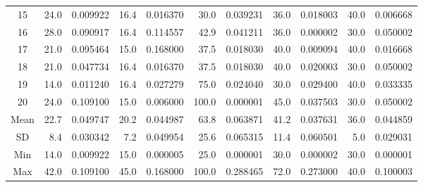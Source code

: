 \documentclass[12pt]{article}
\begin{document}
\begin{table}[h]
\begin{minipage}{\textwidth}
\begin{tabular}{crcrcrcccrc}
15	&	24.0	&	0.009922	&	16.4	&	0.016370	&	30.0	&	0.039231	&	36.0	&	0.018003	&	40.0	&	0.006668	\\
16	&	28.0	&	0.090917	&	16.4	&	0.114557	&	42.9	&	0.041211	&	36.0	&	0.000002	&	30.0	&	0.050002	\\
17	&	21.0	&	0.095464	&	15.0	&	0.168000	&	37.5	&	0.018030	&	40.0	&	0.009094	&	40.0	&	0.016668	\\
18	&	21.0	&	0.047734	&	16.4	&	0.016370	&	37.5	&	0.018030	&	40.0	&	0.020003	&	30.0	&	0.050002	\\
19	&	14.0	&	0.011240	&	16.4	&	0.027279	&	75.0	&	0.024040	&	30.0	&	0.029400	&	40.0	&	0.033335	\\
20	&	24.0	&	0.109100	&	15.0	&	0.006000	&	100.0	&	0.000001	&	45.0	&	0.037503	&	30.0	&	0.050002	\\
\hline
Mean	&	22.7	&	0.049747	&	20.2	&	0.044987	&	63.8	&	0.063871	&	41.2	&	0.037631	&	36.0	&	0.044859	\\
SD	&	8.4	&	0.030342	&	7.2	&	0.049954	&	25.6	&	0.065315	&	11.4	&	0.060501	&	5.0	&	0.029031	\\
Min	&	14.0	&	0.009922	&	15.0	&	0.000005	&	25.0	&	0.000001	&	30.0	&	0.000002	&	30.0	&	0.000001	\\
Max	&	42.0	&	0.109100	&	45.0	&	0.168000	&	100.0	&	0.288465	&	72.0	&	0.273000	&	40.0	&	0.100003	\\
\hline
\end{tabular}
\end{minipage}
\end{table}
\end{document}
